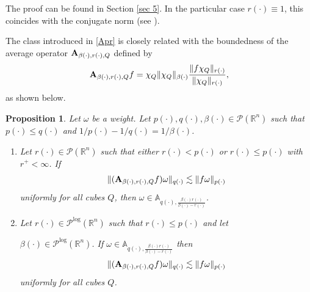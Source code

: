 \documentclass[a4paper,11pt,reqno]{amsart}
\theoremstyle{plain}
\numberwithin{equation}{section}
\newtheorem{propo}[teo]{Proposition}
\theoremstyle{definition}
\newcommand{\R}{{\mathbb{R}^n}}
\begin{document}
The proof can be found in Section \ref{sec 5}.
In the particular case $r(\cdot)\equiv 1$, this coincides with the conjugate norm (see \cite{libro Diening,libro CU-FIO}).



The class introduced in \ref{Apr} is closely related with the boundedness of the average operator ${\bf A}_{\beta(\cdot),r(\cdot),Q}$ defined by 
$${\bf A}_{\beta(\cdot),r(\cdot),Q}f=\chi_Q \|\chi_Q\|_{\beta(\cdot)}\frac{ \|f\chi_Q\|_{r(\cdot)}}{\|\chi_Q\|_{r(\cdot)}},$$
as shown below. 
\begin{propo}\label{caracterizacion Apr}
	Let $\omega$ be a weight. Let $p(\cdot),q(\cdot),\beta(\cdot)\in\mathcal{P}(\R)$ such that $p(\cdot)\leq q(\cdot)$ and $1/p(\cdot)-1/q(\cdot)=1/\beta(\cdot)$.
	
	\begin{enumerate}
		\item Let $r(\cdot)\in\mathcal{P}(\R)$ such that either ${r(\cdot)}<{p(\cdot)}$ or ${r(\cdot)}\leq{p(\cdot)}$ with $r^+<\infty$. If 
		$$\|({\bf A}_{{\beta(\cdot)},{r(\cdot)},Q}f)\omega\|_{q(\cdot)}\lesssim\|f\omega\|_{p(\cdot)}$$
		uniformly for all cubes $Q$, then $\omega\in \mathbb{A}_{{q(\cdot)},\frac{{\beta(\cdot)}{r(\cdot)}}{{\beta(\cdot)}-{r(\cdot)}}}$.	
		\item\label{2 de caract}  Let $r(\cdot)\in\mathcal{P}^{\text{log}}(\R)$ such that ${r(\cdot)}\leq{p(\cdot)}$ and let
		
		 $\beta(\cdot)\in\mathcal{P}^{\text{log}}(\R)$. If $\omega\in \mathbb{A}_{{q(\cdot)},\frac{{\beta(\cdot)}{r(\cdot)}}{{\beta(\cdot)}-{r(\cdot)}}}$ then 	
		$$\|({\bf A}_{{\beta(\cdot)},{r(\cdot)},Q}f)\omega\|_{q(\cdot)}\lesssim\|f\omega\|_{p(\cdot)}$$
		uniformly for all cubes $Q$.
	\end{enumerate}
\end{propo}
\end{document}
